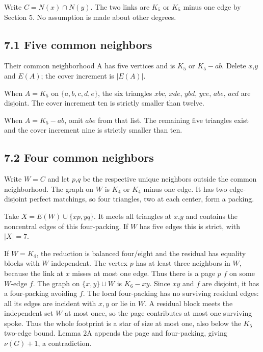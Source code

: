 \documentclass[11pt]{article}
\begin{document}
Write \(C=N(x)\cap N(y)\). The two links are \(K_5\) or \(K_5\) minus
one edge by Section 5. No assumption is made about other degrees.

\subsection{7.1 Five common neighbors}\label{five-common-neighbors}

Their common neighborhood A has five vertices and is \(K_5\) or
\(K_5-ab\). Delete \(x\),\(y\) and \(E(A)\); the cover increment is
\(|E(A)|\).

When \(A=K_5\) on \(\{a,b,c,d,e\}\), the six triangles \(xbc\), \(xde\),
\(ybd\), \(yce\), \(abe\), \(acd\) are disjoint. The cover increment ten
is strictly smaller than twelve.

When \(A=K_5-ab\), omit \(abe\) from that list. The remaining five
triangles exist and the cover increment nine is strictly smaller than
ten.

\subsection{7.2 Four common neighbors}\label{four-common-neighbors}

Write \(W=C\) and let \(p\),\(q\) be the respective unique neighbors
outside the common neighborhood. The graph on \(W\) is \(K_4\) or
\(K_4\) minus one edge. It has two edge-disjoint perfect matchings, so
four triangles, two at each center, form a packing.

Take \(X=E(W)\cup \{xp,yq\}\). It meets all triangles at \(x\),\(y\) and
contains the noncentral edges of this four-packing. If \(W\) has five
edges this is strict, with \(|X|=7\).

If \(W=K_4\), the reduction is balanced four/eight and the residual has
equality blocks with \(W\) independent. The vertex \(p\) has at least
three neighbors in \(W\), because the link at \(x\) misses at most one
edge. Thus there is a page \(p\) \(f\) on some \(W\)-edge \(f\). The
graph on \(\{x,y\}\cup W\) is \(K_6-xy\). Since \(xy\) and \(f\) are
disjoint, it has a four-packing avoiding \(f\). The local four-packing
has no surviving residual edges: all its edges are incident with \(x,y\)
or lie in \(W\). A residual block meets the independent set \(W\) at
most once, so the page contributes at most one surviving spoke. Thus the
whole footprint is a star of size at most one, also below the \(K_5\)
two-edge bound. Lemma 2A appends the page and four-packing, giving
\(\nu(G)+1\), a contradiction.
\end{document}
